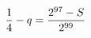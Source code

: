 \documentclass[preview]{standalone}
\begin{document}
\begin{align*}
\special{dvisvgm:raw <g id='unique000'>}\frac14-q=\frac{2^{97}-S}{2^{99}}\special{dvisvgm:raw </g>}
\end{align*}
\end{document}
